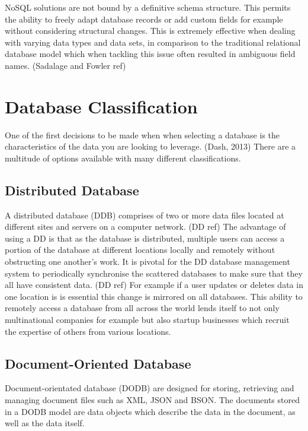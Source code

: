 NoSQL solutions are not bound by a definitive schema structure. This permits the ability to freely adapt database records or add custom fields for example without considering structural changes. This is extremely effective when dealing with varying data types and data sets, in comparison to the traditional relational database model which when tackling this issue often resulted in ambiguous field names. (Sadalage and Fowler ref)

\section{Database Classification}\label{dbclass}
One of the first decisions to be made when when selecting a database is the characteristics of the data you are looking to leverage. (Dash, 2013) There are a multitude of options available with many different classifications.

\subsection{Distributed Database}\label{distributeddb}
A distributed database (DDB) comprises of two or more data files located at different sites and servers on a computer network. (DD ref) The advantage of using a DD is that as the database is distributed, multiple users can access a portion of the database at different locations locally and remotely without obstructing one another's work. It is  pivotal for the DD database management system to periodically synchronise the scattered databases to make sure that they all have consistent data. (DD ref) For example if a user updates or deletes data in one location is is essential this change is mirrored on all databases. This ability to remotely access a database from all across the world lends itself to not only multinational companies for example but also startup businesses which recruit the expertise of others from various locations.

\subsection{Document-Oriented Database}
Document-orientated database (DODB) are designed for storing, retrieving and managing document files such as XML, JSON and BSON. The documents stored in a DODB model are data objects which describe the data in the document, as well as the data itself.

